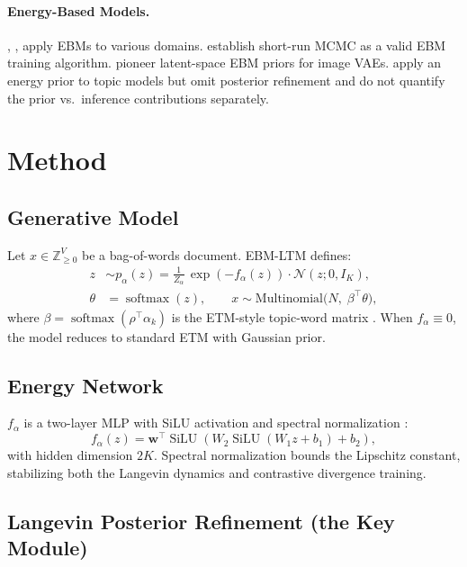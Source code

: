 \documentclass[10pt]{article}
\DeclareMathOperator{\softmax}{softmax}
\begin{document}
\paragraph{Energy-Based Models.}
\citet{lecun2006}, \citet{du2019}, \citet{deng2020} apply EBMs to various domains.
\citet{nijkamp2019shortrun} establish short-run MCMC as a valid EBM training algorithm.
\citet{pang2020} pioneer latent-space EBM priors for image VAEs.
\citet{liu2025} apply an energy prior to topic models but omit posterior refinement
and do not quantify the prior vs.\ inference contributions separately.

\section{Method}
\label{sec:method}

\subsection{Generative Model}

Let $x \in \mathbb{Z}_{\ge 0}^V$ be a bag-of-words document.
EBM-LTM defines:
\begin{align}
    z &\sim p_\alpha(z) = \frac{1}{Z_\alpha}\,\exp(-f_\alpha(z))\cdot\mathcal{N}(z; 0, I_K),
    \label{eq:prior}\\
    \theta &= \softmax(z),\qquad
    x \sim \mathrm{Multinomial}\bigl(N,\;\beta^\top\theta\bigr),
    \label{eq:likelihood}
\end{align}
where $\beta = \softmax(\rho^\top\alpha_k)$ is the ETM-style topic-word matrix \citep{dieng2020}.
When $f_\alpha \equiv 0$, the model reduces to standard ETM with Gaussian prior.

\subsection{Energy Network}

$f_\alpha$ is a two-layer MLP with SiLU activation and spectral normalization
\citep{miyato2018spectral}:
\[
    f_\alpha(z) = \mathbf{w}^\top\operatorname{SiLU}(W_2\operatorname{SiLU}(W_1 z + b_1) + b_2),
\]
with hidden dimension $2K$. Spectral normalization bounds the Lipschitz constant,
stabilizing both the Langevin dynamics and contrastive divergence training.

\subsection{Langevin Posterior Refinement (the Key Module)}
\label{sec:langevin}
\end{document}
